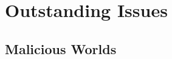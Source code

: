 \documentclass[runningheads,a4paper]{llncs}
\begin{document}
\section{Outstanding Issues}

\subsection{Malicious Worlds}
\end{document}
